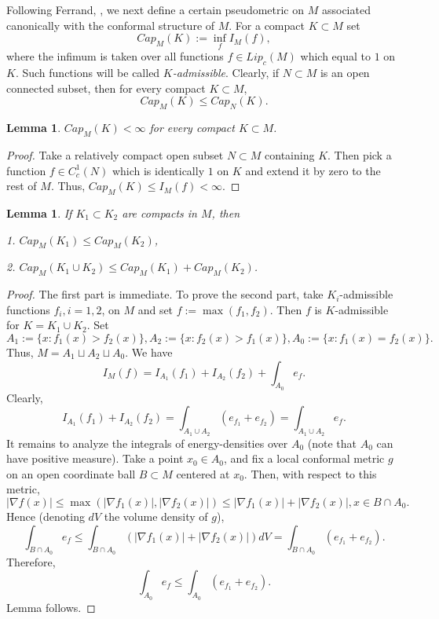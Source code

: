 \documentclass[11pt]{article}   	%
\newtheorem{lem}[thm]{Lemma}
\begin{document}
Following Ferrand, \cite{Ferrand}, we next define a certain pseudometric on $M$ associated canonically with the conformal structure of $M$. 
For a compact $K\subset M$ set
$$
Cap_M(K):= \inf_f I_M(f),
$$
where the infimum is taken over all functions $f\in Lip_c(M)$ which equal to $1$ on $K$. Such functions will be called {\em $K$-admissible}. Clearly, if $N\subset M$ 
is an open connected subset, then for every compact $K\subset M$,
$$
Cap_M(K)\le Cap_N(K). 
$$

\begin{lem}\label{lem:L3}
$Cap_M(K)<\infty$ for every compact $K\subset M$. 
\end{lem}
\begin{proof} Take a relatively compact open subset $N\subset M$ containing $K$. Then pick a function $f\in C^1_c(N)$ which is identically $1$ 
on $K$ and extend it by zero to the rest of $M$. Thus, 
$Cap_M(K)\le I_M(f)<\infty$.  \end{proof}

\begin{lem}\label{lem:L4}
If $K_1\subset K_2$ are compacts in $M$, then 

1. $Cap_M(K_1)\le Cap_M(K_2)$,  

2. $Cap_M(K_1\cup K_2)\le Cap_M(K_1)+ Cap_M(K_2)$.  
\end{lem}
\begin{proof} The first part is immediate. To prove the second part, take $K_i$-admissible functions $f_i, i=1,2$, on $M$ 
and set $f:= \max(f_1, f_2)$. Then $f$ is $K$-admissible for $K=K_1\cup K_2$. Set
$$
A_1:= \{x: f_1(x)> f_2(x)\}, A_2:= \{x: f_2(x)> f_1(x)\}, A_0:= \{x: f_1(x)=f_2(x)\}. 
$$
Thus, $M= A_1\sqcup A_2\sqcup A_0$. We have
$$
I_M(f)= I_{A_1}(f_1) + I_{A_2}(f_2) + \int_{A_0} e_f. 
$$
Clearly,
$$
I_{A_1}(f_1) + I_{A_2}(f_2)= \int_{A_1\cup A_2} (e_{f_1} + e_{f_2})= \int_{A_1\cup A_2} e_f. 
$$
It remains to analyze the integrals of energy-densities over $A_0$ (note that $A_0$ can have positive measure). 
Take a point $x_0\in A_0$, and fix a local conformal metric $g$ on an open coordinate ball $B\subset M$ centered at $x_0$. Then, with respect to this metric, 
$$
|\nabla f(x)|\le \max( |\nabla f_1(x)|, |\nabla f_2(x)|)\le  |\nabla f_1(x)|+ |\nabla f_2(x)|, x\in B\cap A_0.$$ 
Hence (denoting $dV$ the volume density of $g$), 
$$
\int_{B\cap A_0} e_f \le \int_{B\cap A_0}  (|\nabla f_1(x)|+ |\nabla f_2(x)|)dV=  \int_{B\cap A_0} (e_{f_1} + e_{f_2}). 
$$
Therefore, 
$$
\int_{A_0} e_f\le \int_{A_0} (e_{f_1} + e_{f_2}). 
$$
Lemma follows.  
\end{proof}
\end{document}
